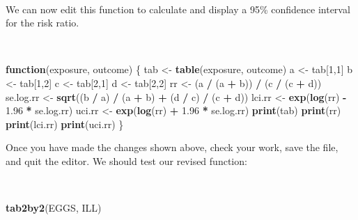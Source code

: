 \documentclass[12pt,a4paper]{book}
\newenvironment{Shaded}{\begin{snugshade}}{\end{snugshade}}
\newcommand{\ControlFlowTok}[1]{\textcolor[rgb]{0.13,0.29,0.53}{\textbf{#1}}}
\newcommand{\DecValTok}[1]{\textcolor[rgb]{0.00,0.00,0.81}{#1}}
\newcommand{\FloatTok}[1]{\textcolor[rgb]{0.00,0.00,0.81}{#1}}
\newcommand{\KeywordTok}[1]{\textcolor[rgb]{0.13,0.29,0.53}{\textbf{#1}}}
\newcommand{\NormalTok}[1]{#1}
\newcommand{\OperatorTok}[1]{\textcolor[rgb]{0.81,0.36,0.00}{\textbf{#1}}}
\newcommand{\StringTok}[1]{\textcolor[rgb]{0.31,0.60,0.02}{#1}}
\theoremstyle{definition}
\theoremstyle{definition}
\theoremstyle{definition}
\theoremstyle{remark}
\begin{document}
~

We can now edit this function to calculate and display a 95\% confidence
interval for the risk ratio.

~

\begin{Shaded}
\begin{Highlighting}[]
\ControlFlowTok{function}\NormalTok{(exposure, outcome) \{}
\NormalTok{  tab <-}\StringTok{ }\KeywordTok{table}\NormalTok{(exposure, outcome)}
\NormalTok{  a <-}\StringTok{ }\NormalTok{tab[}\DecValTok{1}\NormalTok{,}\DecValTok{1}\NormalTok{]}
\NormalTok{  b <-}\StringTok{ }\NormalTok{tab[}\DecValTok{1}\NormalTok{,}\DecValTok{2}\NormalTok{]}
\NormalTok{  c <-}\StringTok{ }\NormalTok{tab[}\DecValTok{2}\NormalTok{,}\DecValTok{1}\NormalTok{]}
\NormalTok{  d <-}\StringTok{ }\NormalTok{tab[}\DecValTok{2}\NormalTok{,}\DecValTok{2}\NormalTok{]}
\NormalTok{  rr <-}\StringTok{ }\NormalTok{(a }\OperatorTok{/}\StringTok{ }\NormalTok{(a }\OperatorTok{+}\StringTok{ }\NormalTok{b)) }\OperatorTok{/}\StringTok{ }\NormalTok{(c }\OperatorTok{/}\StringTok{ }\NormalTok{(c }\OperatorTok{+}\StringTok{ }\NormalTok{d))}
\NormalTok{  se.log.rr <-}\StringTok{ }\KeywordTok{sqrt}\NormalTok{((b }\OperatorTok{/}\StringTok{ }\NormalTok{a) }\OperatorTok{/}\StringTok{ }\NormalTok{(a }\OperatorTok{+}\StringTok{ }\NormalTok{b) }\OperatorTok{+}\StringTok{ }\NormalTok{(d }\OperatorTok{/}\StringTok{ }\NormalTok{c) }\OperatorTok{/}\StringTok{ }\NormalTok{(c }\OperatorTok{+}\StringTok{ }\NormalTok{d)) }
\NormalTok{  lci.rr <-}\StringTok{ }\KeywordTok{exp}\NormalTok{(}\KeywordTok{log}\NormalTok{(rr) }\OperatorTok{-}\StringTok{ }\FloatTok{1.96} \OperatorTok{*}\StringTok{ }\NormalTok{se.log.rr)}
\NormalTok{  uci.rr <-}\StringTok{ }\KeywordTok{exp}\NormalTok{(}\KeywordTok{log}\NormalTok{(rr) }\OperatorTok{+}\StringTok{ }\FloatTok{1.96} \OperatorTok{*}\StringTok{ }\NormalTok{se.log.rr)}
  \KeywordTok{print}\NormalTok{(tab)}
  \KeywordTok{print}\NormalTok{(rr)}
  \KeywordTok{print}\NormalTok{(lci.rr)}
  \KeywordTok{print}\NormalTok{(uci.rr)}
\NormalTok{\}}
\end{Highlighting}
\end{Shaded}

\newpage

Once you have made the changes shown above, check your work, save the
file, and quit the editor. We should test our revised function:

~

\begin{Shaded}
\begin{Highlighting}[]
\KeywordTok{tab2by2}\NormalTok{(EGGS, ILL)}
\end{Highlighting}
\end{Shaded}
\end{document}
